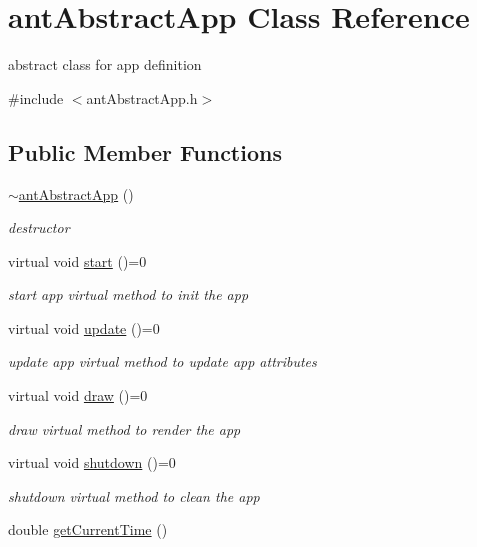 \hypertarget{classant_abstract_app}{\section{ant\+Abstract\+App Class Reference}
\label{classant_abstract_app}
}


abstract class for app definition  




{\ttfamily \#include $<$ant\+Abstract\+App.\+h$>$}

\subsection*{Public Member Functions}
\begin{DoxyCompactItemize}
\item 
\hyperlink{classant_abstract_app_a5567c6adff87b08cb794565804325f6c}{$\sim$ant\+Abstract\+App} ()
\begin{DoxyCompactList}\small\item\em destructor \end{DoxyCompactList}\item 
virtual void \hyperlink{classant_abstract_app_a2e728002d7448d86eb81e2ffb272553e}{start} ()=0
\begin{DoxyCompactList}\small\item\em start app virtual method to init the app \end{DoxyCompactList}\item 
virtual void \hyperlink{classant_abstract_app_a19289810f175a2e19b90536a2a13a96e}{update} ()=0
\begin{DoxyCompactList}\small\item\em update app virtual method to update app attributes \end{DoxyCompactList}\item 
virtual void \hyperlink{classant_abstract_app_a52845a13d22bfc7ba426bc87c0f25cb5}{draw} ()=0
\begin{DoxyCompactList}\small\item\em draw virtual method to render the app \end{DoxyCompactList}\item 
virtual void \hyperlink{classant_abstract_app_ad27fa9b917e951470b6989ab015268c3}{shutdown} ()=0
\begin{DoxyCompactList}\small\item\em shutdown virtual method to clean the app \end{DoxyCompactList}\item 
double \hyperlink{classant_abstract_app_a0e7d74272d53e847e5fa6acc3d399e16}{get\+Current\+Time} ()
\end{DoxyCompactItemize}
